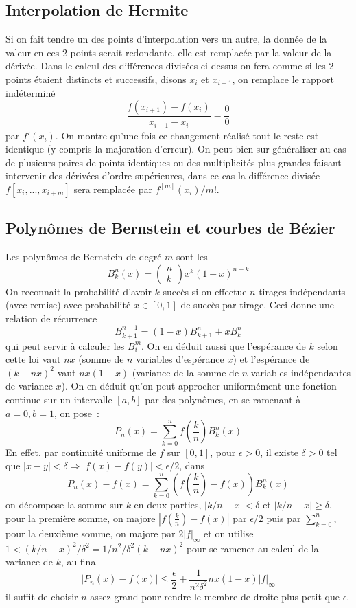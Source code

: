 \documentclass[a4paper,11pt]{article}
\begin{document}
\begin{giacjshere}
\subsection{Interpolation de Hermite}
Si on fait tendre un des points d'interpolation vers un autre, la
donn\'ee de la valeur en ces 2 points serait redondante, elle 
est remplac\'ee par la valeur de la d\'eriv\'ee. Dans le calcul
des diff\'erences divis\'ees ci-dessus on fera comme si les
2 points \'etaient distincts et successifs, disons $x_i$ et $x_{i+1}$,
on remplace le rapport ind\'etermin\'e 
\[ \frac{f(x_{i+1})-f(x_i)}{x_{i+1}-x_i} = \frac00\]
par $f'(x_i)$.
On montre qu'une fois ce changement r\'ealis\'e
tout le reste est identique (y compris la majoration d'erreur).
On peut bien sur g\'en\'eraliser au cas de plusieurs paires de points 
identiques ou des multiplicit\'es plus grandes faisant intervenir
des d\'eriv\'ees d'ordre sup\'erieures, dans ce cas la diff\'erence
divis\'ee $f[x_i,...,x_{i+m}]$ sera remplac\'ee par $f^{[m]}(x_i)/m!$.

\subsection{Polyn\^omes de Bernstein et courbes de
  B\'ezier} 
Les polyn\^omes de Bernstein de degr\'e $m$ sont les
$$ B^n_k (x) = 
\left( \begin{array}{c} n \\ k \end{array} \right) x^k (1-x)^{n-k}$$
On reconnait la probabilit\'e d'avoir $k$ succ\`es si on effectue $n$
tirages ind\'ependants (avec remise) 
avec probabilit\'e $x \in [0,1]$ de succ\`es par tirage. Ceci donne
une relation de r\'ecurrence
$$ B^{n+1}_{k+1}=(1-x)B^n_{k+1}+x B^n_k $$
qui peut servir \`a calculer les $B^m_i$. On en d\'eduit aussi que l'esp\'erance
de $k$ selon cette loi vaut $nx$ (somme de $n$ variables d'esp\'erance
$x$) et l'esp\'erance de $(k-nx)^2$ vaut
$nx(1-x)$ (variance de la somme de $n$ variables ind\'ependantes
de variance $x$).
On en d\'eduit qu'on peut approcher uniform\'ement une
fonction continue sur un intervalle $[a,b]$ par des polyn\^omes, en
se ramenant \`a $a=0, b=1$, on pose~:
$$ P_n(x) = \sum_{k=0}^n f(\frac{k}{n}) B^n_k(x) $$
En effet, par continuit\'e uniforme de $f$ sur $[0,1]$, pour
$\epsilon>0$,
il existe $\delta>0$ tel que $|x-y|<\delta \Rightarrow
|f(x)-f(y)|<\epsilon/2$,
dans
$$P_n(x)-f(x)=\sum_{k=0}^n (f(\frac{k}{n})-f(x)) B^n_k(x)$$
on d\'ecompose la somme sur $k$ en deux parties, $|k/n-x|<\delta$
et $|k/n-x| \geq \delta$, pour la premi\`ere somme, on majore
$|f(\frac{k}{n})-f(x)|$ par $\epsilon/2$ puis par $\sum_{k=0}^n$,
pour la deuxi\`eme somme, on majore par $2|f|_\infty$ et on utilise
$1<(k/n-x)^2/\delta^2=1/n^2/\delta^2 (k-nx)^2$ pour se ramener au calcul
de la variance de $k$, au final
$$ |P_n(x)-f(x)| \leq \frac \epsilon 2 + \frac{1}{n^2 \delta^2} nx(1-x)|f|_\infty$$
il suffit de choisir $n$ assez grand pour rendre le membre de droite
plus petit que $\epsilon$.


\end{giacjshere}
\end{document}
